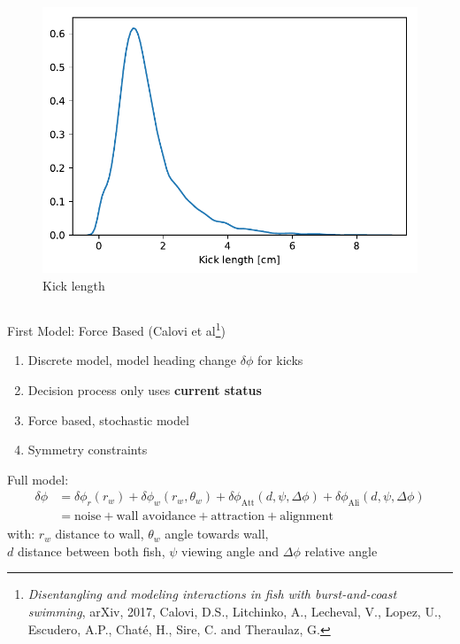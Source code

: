 \documentclass{beamer}
\begin{document}
\begin{frame}
\begin{columns}
\begin{column}{0.4\linewidth}
  \begin{figure}[h]
    \centering
\includegraphics[clip, width=0.8\linewidth]{kick_length.pdf}
    \caption*{Kick length}
  \end{figure}
\end{column}

\end{columns}
\end{frame}

\begin{frame}{First Model: Force Based (Calovi et al\footnote{\hspace*{0.1cm}\textit{Disentangling and modeling interactions in fish with burst-and-coast swimming}, arXiv, 2017, Calovi, D.S., Litchinko, A., Lecheval, V., Lopez, U., Escudero, A.P., Chaté, H., Sire, C. and Theraulaz, G.})}
\begin{enumerate}
\item Discrete model, model heading change $\delta \phi$ for kicks
\item Decision process only uses \textbf{current status}
\item Force based, stochastic model
\item Symmetry constraints 
\end{enumerate}
Full model:
\begin{align*}
  \label{eq:calovi-model}
  \delta \phi &= \delta \phi_r (r_w) + \delta \phi_w (r_w, \theta_w) + \delta \phi_\text{Att} (d, \psi, \Delta \phi) + \delta \phi_\text{Ali}  (d, \psi, \Delta \phi) \\
  &= \text{noise} + \text{wall avoidance} + \text{attraction} + \text{alignment}
\end{align*}
with: $r_w$ distance to wall, $\theta_w$ angle towards wall,\\ $d$ distance between both fish, $\psi$ viewing angle and $\Delta \phi$ relative angle
\end{frame}
\end{document}
